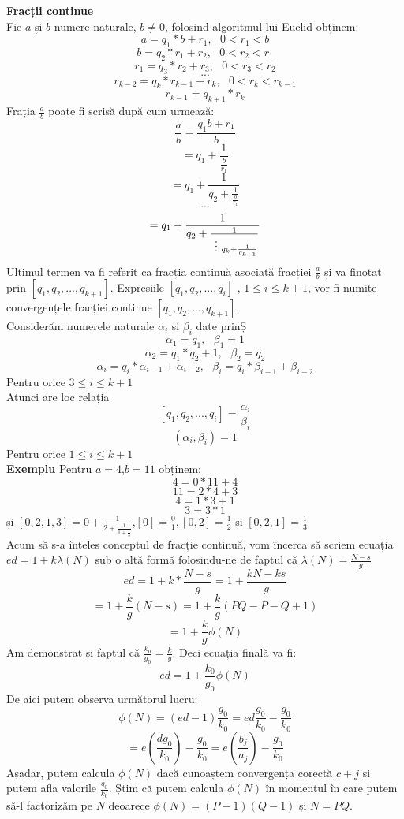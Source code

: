 \documentclass[12]{report}
\begin{document}
\textbf{Fracții continue} \\
Fie $a$ și $b$ numere naturale, $b \neq 0$, folosind algoritmul lui Euclid obținem:
$$a= q_1 *b+r_1, \ \ \ 0<r_1<b$$
$$b=q_2*r_1+r_2, \ \ \ 0<r_2<r_1$$
$$r_1= q_3*r_2+r_3, \ \ \ 0<r_3<r_2$$
$$ ...$$
$$ r_{k-2} = q_k *r_{k-1} +r_k , \ \ \ 0<r_k<r_{k-1}$$
$$ r_{k-1} = q_{k+1} * r_k$$
Frația $\frac{a}{b} $ poate fi scrisă după cum urmează:
$$ \frac{a}{b} = \frac{q_1b+r_1}{b} $$
$$ = q_1 + \frac{1}{\frac{b}{r_1}}$$
$$ = q_1 + \frac{1}{q_2 + \frac{1}{ \frac{b}{r_1}}} $$
$$ ...$$
$$ = q_1 + \frac{1}{q_2 + \frac{1}{\vdotswithin{q_k} q_k + \frac{1}{q_{k+1}}}} $$
Ultimul termen va fi referit ca fracția continuă asociată fracției $\frac{a}{b}$ și va finotat prin $[ q_1,q_2,...,q_{k+1}]$. Expresiile $[q_1,q_2,...,q_i]$ , $1 \leqslant i \leqslant k+1$, vor fi numite convergențele fracției continue $[q_1,q_2,...,q_{k+1}]$.\\
Considerăm numerele naturale $\alpha_{i}$ și $\beta_{i}$ date prinȘ
$$ \alpha_1 =q_1, \ \ \ \beta_1=1$$
$$ \alpha_2 = q_1 * q_2 + 1, \ \ \ \beta_2=q_2$$
$$ \alpha_i = q_i * \alpha_{i-1} + \alpha_{i-2}, \ \ \ \beta_i = q_i * \beta_{i-1} + \beta_{i-2}$$
Pentru orice $3 \leqslant i \leqslant k+1$ \\
Atunci are loc relația 
$$[q_1,q_2,...,q_i] = \frac{\alpha_i}{\beta_i}$$
$$(\alpha_i,\beta_i)=1$$
Pentru orice $1 \leqslant i \leqslant k+1$ \\
\textbf{Exemplu} Pentru $a=4$,$b=11$ obținem:\\
$$4=0*11+4$$
$$11=2*4+3$$
$$4=1*3+1$$
$$3=3*1$$
și $[0,2,1,3]= 0 + \frac{1}{2+\frac{1}{1+\frac{1}{3}}}$,$[0]=\frac{0}{1},[0,2]=\frac{1}{2}$ și $[0,2,1]=\frac{1}{3}$  \\
Acum să s-a înțeles conceptul de fracție continuă, vom încerca să scriem  ecuația $ed=1+k\lambda(N)$ sub o altă formă folosindu-ne de faptul că $\lambda(N)= \frac{N-s}{g}$
$$ ed = 1+k * \frac{N-s}{g} = 1 + \frac{kN-ks}{g}$$
$$ = 1+ \frac{k}{g}(N-s) = 1 + \frac{k}{g} (PQ - P - Q +1)$$
$$ = 1+\frac{k}{g}\phi(N)$$
Am demonstrat și faptul că $\frac{k_0}{g_0} = \frac{k}{g}$. Deci ecuația finală va fi:
$$ ed=1+\frac{k_0}{g_0}\phi(N)$$
De aici putem observa următorul lucru:
$$\phi(N) = (ed - 1 )\frac{g_0}{k_0}=ed \frac{g_0}{k_0} - \frac{g_0}{k_0}$$
$$ = e \left(  \frac{dg_0}{k_0}  \right) - \frac{g_0}{k_0} = e \left( \frac{b_j}{a_j}  \right) - \frac{g_0}{k_0}$$
Așadar, putem calcula $\phi(N)$ dacă cunoaștem convergența corectă $c+j$ și putem afla valorile $\frac{g_0}{k_0}$. Știm că putem calcula $\phi(N)$ în momentul în care putem să-l factorizăm pe $N$ deoarece $\phi(N)=(P-1)(Q-1)$ și $N=PQ$. \\
\end{document}
